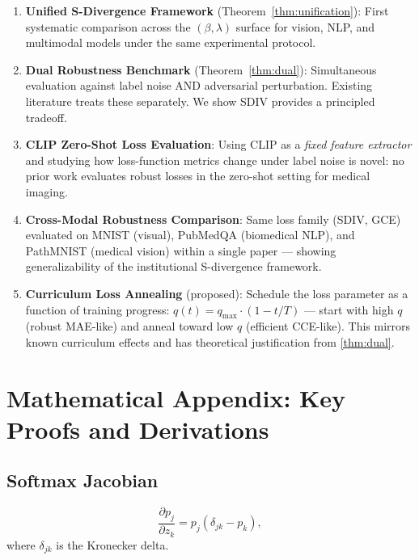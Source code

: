 \documentclass[11pt,a4paper]{article}
\begin{document}
\begin{enumerate}
  \item \textbf{Unified S-Divergence Framework} (Theorem~\ref{thm:unification}):
  First systematic comparison across the $(\beta,\lambda)$ surface for vision, NLP, and
  multimodal models under the same experimental protocol.

  \item \textbf{Dual Robustness Benchmark} (Theorem~\ref{thm:dual}):
  Simultaneous evaluation against label noise AND adversarial perturbation. Existing
  literature treats these separately. We show SDIV provides a principled tradeoff.

  \item \textbf{CLIP Zero-Shot Loss Evaluation}:
  Using CLIP as a \emph{fixed feature extractor} and studying how loss-function metrics
  change under label noise is novel: no prior work evaluates robust losses in the
  zero-shot setting for medical imaging.

  \item \textbf{Cross-Modal Robustness Comparison}:
  Same loss family (SDIV, GCE) evaluated on MNIST (visual), PubMedQA (biomedical NLP),
  and PathMNIST (medical vision) within a single paper — showing generalizability of
  the institutional S-divergence framework.

  \item \textbf{Curriculum Loss Annealing} (proposed):
  Schedule the loss parameter as a function of training progress:
  $q(t) = q_{\max} \cdot (1 - t/T)$ — start with high $q$ (robust MAE-like) and anneal
  toward low $q$ (efficient CCE-like). This mirrors known curriculum effects and has
  theoretical justification from \cref{thm:dual}.
\end{enumerate}

\section{Mathematical Appendix: Key Proofs and Derivations}
\label{sec:appendix}

\subsection{Softmax Jacobian}

\[
  \frac{\partial p_j}{\partial z_k} = p_j(\delta_{jk} - p_k),
\]
where $\delta_{jk}$ is the Kronecker delta.
\end{document}
